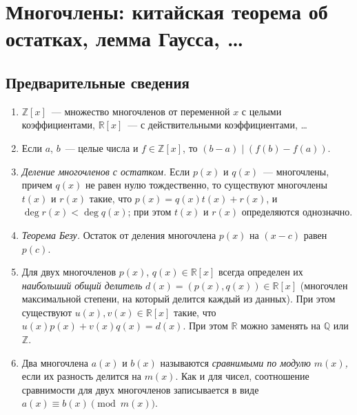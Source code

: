 

\section*{Многочлены: китайская теорема об остатках, лемма Гаусса, \ldots}


\subsection*{Предварительные сведения}

\begin{enumerate}

\item
$\mathbb{Z}[x]$~--- множество многочленов от переменной $x$ с целыми
коэффициентами,
$\mathbb{R}[x]$~--- с действительными коэффициентами,
\ldots

\item
Если $a$, $b$~--- целые числа и $f \in \mathbb{Z}[x]$, то
$(b - a) \mid (f(b) - f(a))$.

\item\emph{Деление многочленов с остатком.}
Если $p(x)$ и $q(x)$~--- многочлены, причем $q(x)$ не равен нулю
тождественно, то существуют многочлены $t(x)$ и $r(x)$ такие, что
$p(x) = q(x) t(x) + r(x)$, и $\deg r(x)<\deg q(x)$;
при этом $t(x)$ и $r(x)$ определяются однозначно.

\item\emph{Теорема Безу.}
Остаток от деления многочлена $p(x)$ на $(x - c)$ равен $p(c)$.

\item
Для двух многочленов $p(x)$, $q(x) \in \mathbb{R}[x]$ всегда определен их
\emph{наибольший общий делитель} $d(x) = (p(x), q(x)) \in \mathbb{R}[x]$
(многочлен максимальной степени, на который делится каждый из данных).
При этом существуют $u(x), v(x) \in \mathbb{R}[x]$ такие, что
$u(x) p(x) + v(x) q(x) = d(x)$.
При этом $\mathbb{R}$ можно заменять на $\mathbb{Q}$ или $\mathbb{Z}$.

\item
Два многочлена $a(x)$ и $b(x)$ называются \emph{сравнимыми по модулю $m(x)$,}
если их разность делится на $m(x)$.
Как и для чисел, соотношение сравнимости для двух многочленов записывается в
виде $a(x) \equiv b(x) \pmod{m(x)}$.

\end{enumerate}

